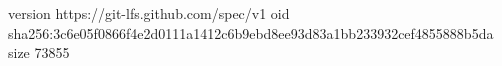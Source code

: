 version https://git-lfs.github.com/spec/v1
oid sha256:3c6e05f0866f4e2d0111a1412c6b9ebd8ee93d83a1bb233932cef4855888b5da
size 73855
